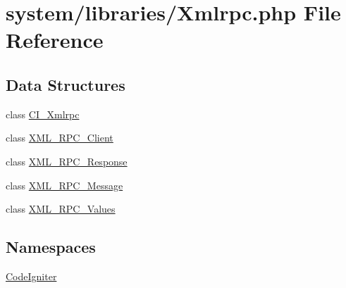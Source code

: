 \hypertarget{_xmlrpc_8php}{\section{system/libraries/\-Xmlrpc.php File Reference}
\label{_xmlrpc_8php}
}
\subsection*{Data Structures}
\begin{DoxyCompactItemize}
\item 
class \hyperlink{class_c_i___xmlrpc}{C\-I\-\_\-\-Xmlrpc}
\item 
class \hyperlink{class_x_m_l___r_p_c___client}{X\-M\-L\-\_\-\-R\-P\-C\-\_\-\-Client}
\item 
class \hyperlink{class_x_m_l___r_p_c___response}{X\-M\-L\-\_\-\-R\-P\-C\-\_\-\-Response}
\item 
class \hyperlink{class_x_m_l___r_p_c___message}{X\-M\-L\-\_\-\-R\-P\-C\-\_\-\-Message}
\item 
class \hyperlink{class_x_m_l___r_p_c___values}{X\-M\-L\-\_\-\-R\-P\-C\-\_\-\-Values}
\end{DoxyCompactItemize}
\subsection*{Namespaces}
\begin{DoxyCompactItemize}
\item 
\hyperlink{namespace_code_igniter}{Code\-Igniter}
\end{DoxyCompactItemize}
